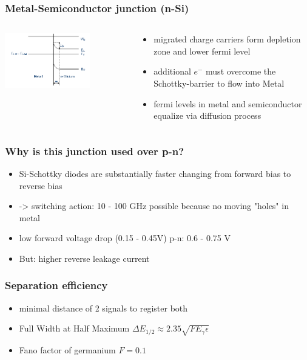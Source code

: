 \documentclass[aspectratio=1610, 12pt]{beamer}
\begin{document}
\begin{frame}\frametitle{Metal-Semiconductor junction (n-Si)}
  \begin{columns}
    \begin{column}[c]{0.48\textwidth}
      \includegraphics[width=0.7\textwidth]{plots/post_m_s.png}
    \end{column}
    \begin{column}[c]{0.48\textwidth}
      \begin{itemize}
        \item migrated charge carriers form depletion zone and lower fermi level
        \item additional $e^{-}$ must overcome the Schottky-barrier to flow into Metal
        \item fermi levels in metal and semiconductor equalize via diffusion process
      \end{itemize}
    \end{column}
  \end{columns}
\end{frame}

\begin{frame}\frametitle{Why is this junction used over p-n?}
  \begin{itemize}
    \item Si-Schottky diodes are substantially faster changing from forward bias to reverse bias
    \item -> switching action: 10 - 100 GHz possible because no moving "holes" in metal
    \item low forward voltage drop (0.15 - 0.45V) p-n: 0.6 - 0.75 V
    \item But: higher reverse leakage current
  \end{itemize}
\end{frame}

\begin{frame}\frametitle{Separation efficiency}
  \begin{itemize}
    \item minimal distance of 2 signals to register both
    \item Full Width at Half Maximum $\Delta E_{1/2} \approx 2.35 \sqrt{F E_\gamma \epsilon}$
    \item Fano factor of germanium $F = 0.1$
  \end{itemize}
\end{frame}
\end{document}
